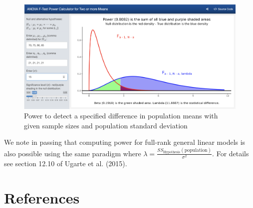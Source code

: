 \documentclass[
]{article}
\begin{document}
\begin{figure}

{\centering \includegraphics[width=7.35in]{./pics/fig-power4b} 

}

\caption{Power to detect a specified difference in population means with given sample sizes and population standard deviation}\label{fig:power4}
\end{figure}

We note in passing that computing power for full-rank general linear models is also possible using the same paradigm where \(\lambda = \frac{SS_\text{Hypothesis}(\text{population})}{\sigma^2}\). For details see section 12.10 of Ugarte et al. (2015).

\hypertarget{references}{%
\section*{References}\label{references}}
\end{document}
